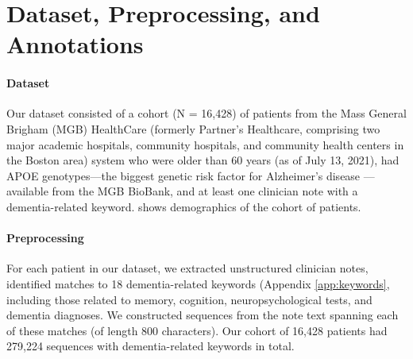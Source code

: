 \documentclass[pmlr,twocolumn,10pt]{jmlr} %
\begin{document}
\section{Dataset, Preprocessing, and Annotations}
\label{sec:Dataset+Preprocessing+Annotations}

\paragraph{Dataset}
\label{sec:Dataset} Our dataset consisted of a cohort (N = 16,428) of patients from the Mass General Brigham (MGB) HealthCare (formerly Partner's Healthcare, comprising two major academic hospitals, community hospitals, and community health centers in the Boston area) system who were older than 60 years (as of July 13, 2021), had APOE genotypes—the biggest genetic risk factor for Alzheimer's disease  \citep{mahley2000apolipoprotein}—available from the MGB BioBank, and at least one clinician note with a dementia-related keyword.  shows demographics of the cohort of patients.   

\paragraph{Preprocessing}
\label{sec:Preprocessing} For each patient in our dataset, we extracted unstructured clinician notes, identified matches to 18 dementia-related keywords (Appendix \ref{app:keywords}, including those related to memory, cognition, neuropsychological tests, and dementia diagnoses. We constructed sequences from the note text spanning each of these matches (of length 800 characters). Our cohort of 16,428 patients had 279,224 sequences with dementia-related keywords in total.
\end{document}
